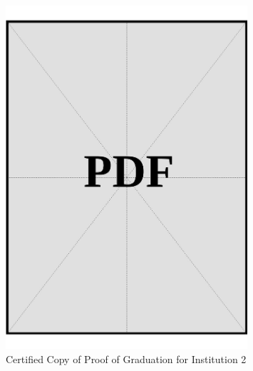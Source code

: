 \begin{figure}[h]
    \centering
    \includegraphics[page=1, width=0.8\textwidth]{../docs/applicant/post-secondary-institutions/institution-2/proof-of-graduation/certified-copies.pdf}
    \caption{Certified Copy of Proof of Graduation for Institution 2}
    \label{fig:institution-2-proof-of-graduation-certified-copy}
\end{figure}

\vspace*{\fill}
\clearpage
